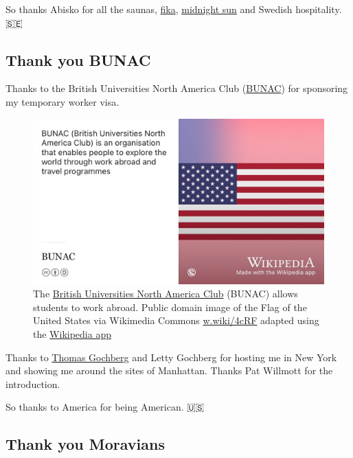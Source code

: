 \documentclass[
]{book}
\begin{document}
So thanks Abisko for all the saunas, \href{https://www.swedishfood.com/fika}{fika}, \href{https://en.wikipedia.org/wiki/Midnight_sun}{midnight sun} and Swedish hospitality. 🇸🇪🙏

\hypertarget{usa}{%
\subsection{Thank you BUNAC}\label{usa}}

Thanks to the British Universities North America Club (\href{https://en.wikipedia.org/wiki/BUNAC}{BUNAC}) for sponsoring my temporary worker visa.

\begin{figure}

{\centering \includegraphics[width=0.99\linewidth]{images/BUNAC} 

}

\caption{The \href{https://en.wikipedia.org/wiki/BUNAC}{British Universities North America Club} (BUNAC) allows students to work abroad. Public domain image of the Flag of the United States via Wikimedia Commons \href{https://w.wiki/4cRF}{w.wiki/4cRF} adapted using the \href{https://apps.apple.com/us/app/wikipedia/id324715238}{Wikipedia app}}\label{fig:bunac-fig}
\end{figure}



Thanks to \href{https://wi.mit.edu/news/memoriam-thomas-gochberg}{Thomas Gochberg} and Letty Gochberg for hosting me in New York and showing me around the sites of Manhattan. Thanks Pat Willmott for the introduction.

So thanks to America for being American. 🇺🇸🙏

\hypertarget{moravians}{%
\subsection{Thank you Moravians}\label{moravians}}
\end{document}
